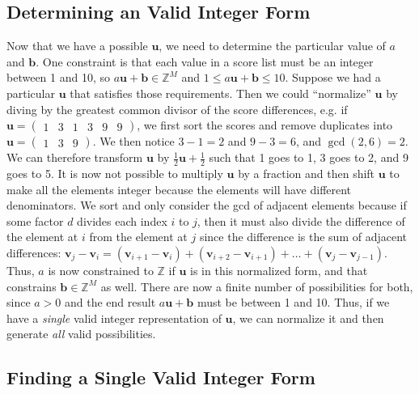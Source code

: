 \documentclass[11pt, oneside]{article}
\renewcommand{\vec}[1]{\bm{#1}}
\theoremstyle{plain}
\theoremstyle{definition}
\begin{document}
\subsection{Determining an Valid Integer Form}
\label{subsec:norm}
Now that we have a possible \( \vec{u} \), we need to determine the particular
value of \( a \) and \( \vec{b} \). One constraint is that each value in a
score list must be an integer between 1 and 10, so \( a \vec{u} + \vec{b} \in
\mathbb{Z}^M \) and \( 1 \leq a \vec{u} + \vec{b} \leq 10 \). Suppose we had
a particular \( \vec{u} \) that satisfies those requirements. Then we could
\enquote{normalize} \( \vec{u} \) by diving by the greatest common divisor of
the score differences, e.g. if \( \vec{u} = \begin{pmatrix} 1 & 3 & 1 & 3 &
9 & 9 \end{pmatrix} \), we first sort the scores and remove duplicates into
\( \vec{u} = \begin{pmatrix} 1 & 3 & 9 \end{pmatrix} \). We then notice \( 3
- 1 = 2 \) and \( 9 - 3 = 6 \), and \( \gcd(2, 6) = 2 \). We can therefore
transform \( \vec{u} \) by \( \frac{1}{2} \vec{u} + \frac{1}{2} \) such that
1 goes to 1, 3 goes to 2, and 9 goes to 5. It is now not possible to multiply
\( \vec{u} \) by a fraction and then shift \( \vec{u} \) to make all the
elements integer because the elements will have different denominators. We
sort and only consider the gcd of adjacent elements because if some factor
\( d \) divides each index \( i \) to \( j \), then it must also divide the
difference of the element at \( i \) from the element at \( j \) since the
difference is the sum of adjacent differences: \( \vec{v}_j - \vec{v}_i =
(\vec{v}_{i + 1} - \vec{v}_i) + (\vec{v}_{i + 2} - \vec{v}_{i + 1}) + \dots
+ (\vec{v}_j - \vec{v}_{j - 1}) \). Thus, \( a \) is now constrained to \(
\mathbb{Z} \) if \( \vec{u} \) is in this normalized form, and that constrains
\( \vec{b} \in \mathbb{Z}^M \) as well. There are now a finite number of
possibilities for both, since \( a > 0 \) and the end result \( a \vec{u}
+ \vec{b} \) must be between 1 and 10. Thus, if we have a \textit{single}
valid integer representation of \( \vec{u} \), we can normalize it and then
generate \textit{all} valid possibilities.

\subsection{Finding a Single Valid Integer Form}
\end{document}
